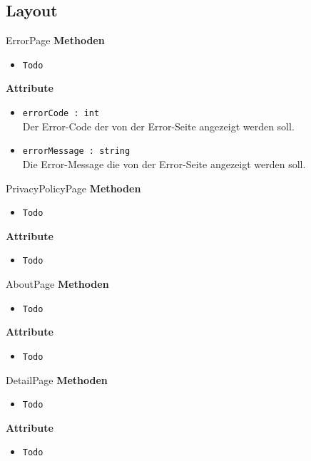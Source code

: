 \subsection{Layout}

    \begin{Class}{ErrorPage}
        \textbf{Methoden}
        \begin{itemize}
            \item \texttt{Todo}
        \end{itemize}
        
        \textbf{Attribute}
        \begin{itemize}
            \item \texttt{errorCode : int}
            \\Der Error-Code der von der Error-Seite angezeigt werden soll.
            \item \texttt{errorMessage : string}
            \\Die Error-Message die von der Error-Seite angezeigt werden soll.
        \end{itemize}
    \end{Class}

    \begin{Class}{PrivacyPolicyPage}
        \textbf{Methoden}
        \begin{itemize}
            \item \texttt{Todo}
        \end{itemize}
        
        \textbf{Attribute}
        \begin{itemize}
            \item \texttt{Todo}
        \end{itemize}
    \end{Class}

    \begin{Class}{AboutPage}
        \textbf{Methoden}
        \begin{itemize}
            \item \texttt{Todo}
        \end{itemize}
        
        \textbf{Attribute}
        \begin{itemize}
            \item \texttt{Todo}
        \end{itemize}
    \end{Class}

    \begin{Class}{DetailPage}
        \textbf{Methoden}
        \begin{itemize}
            \item \texttt{Todo}
        \end{itemize}
        
        \textbf{Attribute}
        \begin{itemize}
            \item \texttt{Todo}
        \end{itemize}
    \end{Class}

